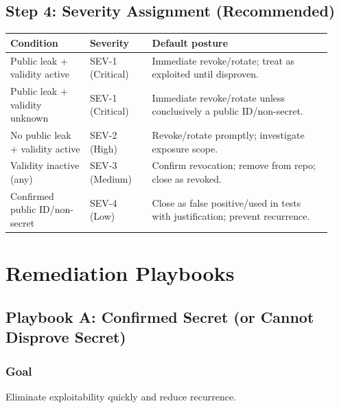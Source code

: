 \documentclass[11pt]{article}
\begin{document}
\subsection{Step 4: Severity Assignment (Recommended)}
\begin{longtable}{@{}p{0.23\linewidth}p{0.18\linewidth}p{0.52\linewidth}@{}}
\toprule
\textbf{Condition} & \textbf{Severity} & \textbf{Default posture} \\
\midrule
Public leak + validity active & SEV-1 (Critical) & Immediate revoke/rotate; treat as exploited until disproven. \\
Public leak + validity unknown & SEV-1 (Critical) & Immediate revoke/rotate unless conclusively a public ID/non-secret. \\
No public leak + validity active & SEV-2 (High) & Revoke/rotate promptly; investigate exposure scope. \\
Validity inactive (any) & SEV-3 (Medium) & Confirm revocation; remove from repo; close as revoked. \\
Confirmed public ID/non-secret & SEV-4 (Low) & Close as false positive/used in tests with justification; prevent recurrence. \\
\bottomrule
\end{longtable}

\section{Remediation Playbooks}
\subsection{Playbook A: Confirmed Secret (or Cannot Disprove Secret)}
\subsubsection{Goal}
Eliminate exploitability quickly and reduce recurrence.
\end{document}
